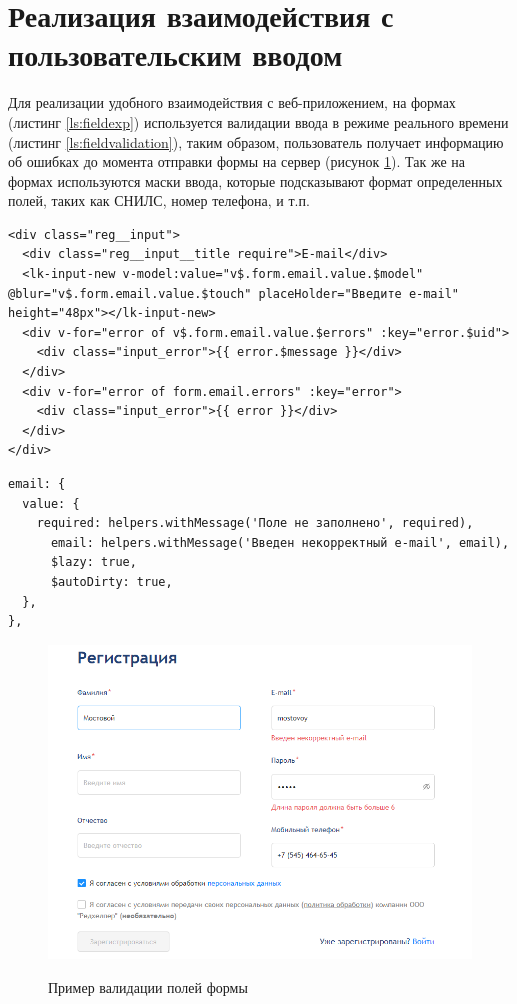 \section{Реализация взаимодействия с пользовательским вводом}

Для реализации удобного взаимодействия с веб-приложением, на формах (листинг \ref{ls:fieldexp}) используется валидации ввода в режиме реального времени (листинг \ref{ls:fieldvalidation}), таким образом, пользователь получает информацию об ошибках до момента отправки формы на сервер (рисунок \ref{fig:regvalidation}). Так же на формах используются маски ввода, которые подсказывают формат определенных полей, таких как СНИЛС, номер телефона, и т.п.

\begin{lstlisting}[caption={Пример реализации поля в шаблоне}, label={ls:fieldexp}]
<div class="reg__input">
  <div class="reg__input__title require">E-mail</div>
  <lk-input-new v-model:value="v$.form.email.value.$model" @blur="v$.form.email.value.$touch" placeHolder="Введите e-mail" height="48px"></lk-input-new>
  <div v-for="error of v$.form.email.value.$errors" :key="error.$uid">
    <div class="input_error">{{ error.$message }}</div>
  </div>
  <div v-for="error of form.email.errors" :key="error">
    <div class="input_error">{{ error }}</div>
  </div>
</div>
\end{lstlisting}

\begin{lstlisting}[caption={Пример определения правил валидации поля}, label={ls:fieldvalidation}]
email: {
  value: {
    required: helpers.withMessage('Поле не заполнено', required),
      email: helpers.withMessage('Введен некорректный e-mail', email),
      $lazy: true,
      $autoDirty: true,
  },
},
\end{lstlisting}

\begin{figure}[H]
\begin{center}
\includegraphics[width=0.9\hsize]{fig/reg.png}\\[2mm]
\caption{Пример валидации полей формы}\label{fig:regvalidation}
\end{center}
\end{figure}

